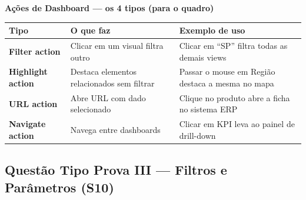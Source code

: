 \begin{BoardBox}
\textbf{Ações de Dashboard — os 4 tipos (para o quadro)}

\begin{tabular}{|l|p{5cm}|p{5.5cm}|}
\hline
\textbf{Tipo} & \textbf{O que faz} & \textbf{Exemplo de uso} \\
\hline
\textbf{Filter action} & Clicar em um visual filtra outro & Clicar em ``SP'' filtra todas as demais views \\
\textbf{Highlight action} & Destaca elementos relacionados sem filtrar & Passar o mouse em Região destaca a mesma no mapa \\
\textbf{URL action} & Abre URL com dado selecionado & Clique no produto abre a ficha no sistema ERP \\
\textbf{Navigate action} & Navega entre dashboards & Clicar em KPI leva ao painel de drill-down \\
\hline
\end{tabular}
\end{BoardBox}

\subsection{Questão Tipo Prova III — Filtros e Parâmetros (S10)}

